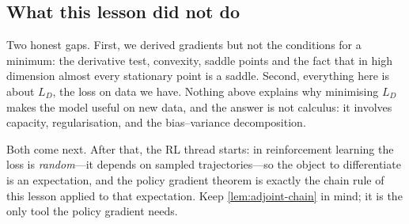 \subsection{What this lesson did not do}

Two honest gaps. First, we derived gradients but not the conditions for a
minimum: the derivative test, convexity, saddle points and the fact that in
high dimension almost every stationary point is a saddle. Second, everything
here is about $L_D$, the loss on data we have. Nothing above explains why
minimising $L_D$ makes the model useful on new data, and the answer is not
calculus: it involves capacity, regularisation, and the bias--variance
decomposition.

Both come next. After that, the RL thread starts: in reinforcement learning the
loss is \emph{random}---it depends on sampled trajectories---so the object to
differentiate is an expectation, and the policy gradient theorem is exactly the
chain rule of this lesson applied to that expectation. Keep \cref{lem:adjoint-chain}
in mind; it is the only tool the policy gradient needs.
